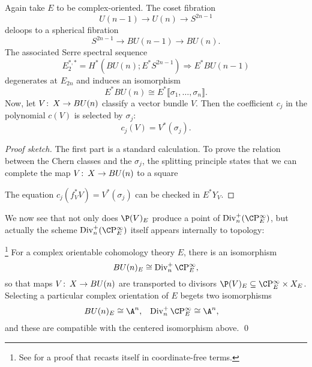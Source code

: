 \begin{theorem}\label{ChernClassesAreSymmInChernRoots}
Again take $E$ to be complex-oriented.  The coset fibration \[U(n-1) \to U(n) \to S^{2n-1}\] deloops to a spherical fibration \[S^{2n-1} \to BU(n-1) \to BU(n).\]  The associated Serre spectral sequence \[E_2^{*, *} = H^*(BU(n); E^* S^{2n-1}) \Rightarrow E^* BU(n-1)\] degenerates at $E_{2n}$ and induces an isomorphism \[E^* BU(n) \cong E^* \llbracket \sigma_1, \ldots, \sigma_n\rrbracket.\]  Now, let $V\colon\thinspace X \to BU(n)$ classify a vector bundle $V$.  Then the coefficient $c_j$ in the polynomial $c(V)$ is selected by $\sigma_j$: \[c_j(V) = V^*(\sigma_j).\]
\end{theorem}
\begin{proof}[Proof sketch]
The first part is a standard calculation.  To prove the relation between the Chern classes and the $\sigma_j$, the splitting principle states that we can complete the map $V\colon\thinspace X \to BU(n)$ to a square
\begin{center}
\end{center}
The equation $c_j(f_V^* V) = V^*(\sigma_j)$ can be checked in $E^* Y_V$.
\end{proof}

We now see that not only does $\P(V)_E$ produce a point of $\Div_n^+(\CP^\infty_E)$, but actually the scheme $\Div_n^+(\CP^\infty_E)$ itself appears internally to topology:

\begin{corollary}\footnote{See \cite[Proposition 8.31]{StricklandFSFG} for a proof that recasts  itself in coordinate-free terms.}\label{IdentificationOfBUnWithDivn}
For a complex orientable cohomology theory $E$, there is an isomorphism \[BU(n)_E \cong \Div_n^+ \CP^\infty_E,\] so that maps $V\colon\thinspace X \to BU(n)$ are transported to divisors $\P(V)_E \subseteq \CP^\infty_E \times X_E$.  Selecting a particular complex orientation of $E$ begets two isomorphisms
\begin{align*}
BU(n)_E & \cong \A^n, &
\Div_n^+ \CP^\infty_E & \cong \A^n,
\end{align*}
and these are compatible with the centered isomorphism above. \qed
\end{corollary}

